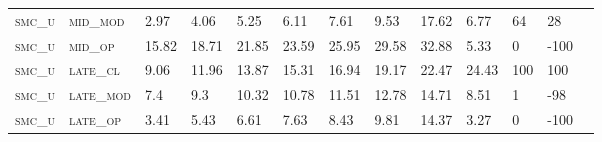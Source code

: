 \begin{landscape}
\begin{table}[!htbp]
\begin{tabular}{@{}lllllllllllll@{}}
\footnotesize \textsc{smc\_u}      & \footnotesize \textsc{mid\_mod  }               & \footnotesize 2.97            & \footnotesize 4.06            & \footnotesize 5.25             & \footnotesize 6.11             & \footnotesize 7.61             & \footnotesize 9.53             & \footnotesize 17.62       & \footnotesize 6.77     & \footnotesize 64     & \footnotesize 28       \\
\footnotesize \textsc{smc\_u}      & \footnotesize \textsc{mid\_op   }               & \footnotesize 15.82           & \footnotesize 18.71           & \footnotesize 21.85            & \footnotesize 23.59            & \footnotesize 25.95            & \footnotesize 29.58            & \footnotesize 32.88       & \footnotesize 5.33     & \footnotesize 0      & \footnotesize -100     \\
\footnotesize \textsc{smc\_u}      & \footnotesize \textsc{late\_cl  }               & \footnotesize 9.06            & \footnotesize 11.96           & \footnotesize 13.87            & \footnotesize 15.31            & \footnotesize 16.94            & \footnotesize 19.17            & \footnotesize 22.47       & \footnotesize 24.43    & \footnotesize 100    & \footnotesize 100      \\
\footnotesize \textsc{smc\_u}      & \footnotesize \textsc{late\_mod }               & \footnotesize 7.4             & \footnotesize 9.3             & \footnotesize 10.32            & \footnotesize 10.78            & \footnotesize 11.51            & \footnotesize 12.78            & \footnotesize 14.71       & \footnotesize 8.51     & \footnotesize 1      & \footnotesize -98      \\
\footnotesize \textsc{smc\_u}      & \footnotesize \textsc{late\_op  }               & \footnotesize 3.41            & \footnotesize 5.43            & \footnotesize 6.61             & \footnotesize 7.63             & \footnotesize 8.43             & \footnotesize 9.81             & \footnotesize 14.37       & \footnotesize 3.27     & \footnotesize 0      & \footnotesize -100     \\
\end{tabular}
\end{table}
\end{landscape}


